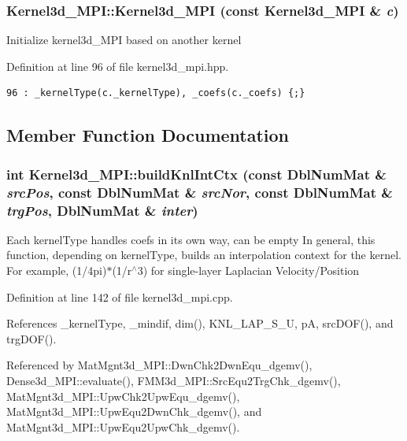 \subsubsection{\setlength{\rightskip}{0pt plus 5cm}Kernel3d\_\-MPI::Kernel3d\_\-MPI (const {\bf Kernel3d\_\-MPI} \& {\em c})\hspace{0.3cm}{\tt  [inline]}}\label{classKernel3d__MPI_c89f06f32cb46b2b86271fc04e1cfd40_c89f06f32cb46b2b86271fc04e1cfd40}


Initialize kernel3d\_\-MPI based on another kernel 

Definition at line 96 of file kernel3d\_\-mpi.hpp.

\footnotesize\begin{verbatim}96 : _kernelType(c._kernelType), _coefs(c._coefs) {;}
\end{verbatim}\normalsize 




\subsection{Member Function Documentation}
\subsubsection{\setlength{\rightskip}{0pt plus 5cm}int Kernel3d\_\-MPI::build\-Knl\-Int\-Ctx (const Dbl\-Num\-Mat \& {\em src\-Pos}, const Dbl\-Num\-Mat \& {\em src\-Nor}, const Dbl\-Num\-Mat \& {\em trg\-Pos}, Dbl\-Num\-Mat \& {\em inter})}\label{classKernel3d__MPI_4ff7c1aa272081dddc16c4996c95a5df_4ff7c1aa272081dddc16c4996c95a5df}


Each kernel\-Type handles coefs in its own way, can be empty In general, this function, depending on kernel\-Type, builds an interpolation context for the kernel. For example, (1/4pi)$\ast$(1/r$^\wedge$3) for single-layer Laplacian Velocity/Position 

Definition at line 142 of file kernel3d\_\-mpi.cpp.

References \_\-kernel\-Type, \_\-mindif, dim(), KNL\_\-LAP\_\-S\_\-U, p\-A, src\-DOF(), and trg\-DOF().

Referenced by Mat\-Mgnt3d\_\-MPI::Dwn\-Chk2Dwn\-Equ\_\-dgemv(), Dense3d\_\-MPI::evaluate(), FMM3d\_\-MPI::Src\-Equ2Trg\-Chk\_\-dgemv(), Mat\-Mgnt3d\_\-MPI::Upw\-Chk2Upw\-Equ\_\-dgemv(), Mat\-Mgnt3d\_\-MPI::Upw\-Equ2Dwn\-Chk\_\-dgemv(), and Mat\-Mgnt3d\_\-MPI::Upw\-Equ2Upw\-Chk\_\-dgemv().

